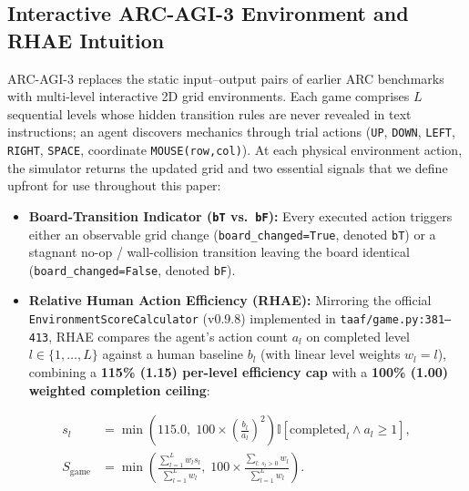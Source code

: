 \documentclass[10pt]{article}
\newcommand{\code}[1]{\texttt{#1}}
\begin{document}
\subsection{Interactive ARC-AGI-3 Environment and RHAE Intuition}
ARC-AGI-3 \citep{chollet2026arc3} replaces the static input--output pairs of earlier ARC benchmarks with multi-level interactive 2D grid environments. Each game comprises $L$ sequential levels whose hidden transition rules are never revealed in text instructions; an agent discovers mechanics through trial actions (\code{UP}, \code{DOWN}, \code{LEFT}, \code{RIGHT}, \code{SPACE}, coordinate \code{MOUSE(row,col)}). At each physical environment action, the simulator returns the updated grid and two essential signals that we define upfront for use throughout this paper:
\begin{itemize}[leftmargin=1.4em,itemsep=2pt]
\item \textbf{Board-Transition Indicator (\code{bT} vs.\ \code{bF}):} Every executed action triggers either an observable grid change (\code{board\_changed=True}, denoted \code{bT}) or a stagnant no-op / wall-collision transition leaving the board identical (\code{board\_changed=False}, denoted \code{bF}).
\item \textbf{Relative Human Action Efficiency (RHAE):} Mirroring the official \code{EnvironmentScoreCalculator} (v0.9.8) implemented in \code{taaf/game.py:381--413}, RHAE compares the agent's action count $a_l$ on completed level $l \in \{1,\dots,L\}$ against a human baseline $b_l$ (with linear level weights $w_l = l$), combining a \textbf{115\% (1.15) per-level efficiency cap} with a \textbf{100\% (1.00) weighted completion ceiling}:
\end{itemize}
\begin{equation}
\begin{aligned}
s_l &= \min\!\left(115.0,\; 100 \times \left(\frac{b_l}{a_l}\right)^{\!2}\right)\mathbb{I}[\text{completed}_l \land a_l \ge 1], \\
S_{\text{game}} &= \min\!\left(\frac{\sum_{l=1}^L w_l s_l}{\sum_{l=1}^L w_l},\; 100 \times \frac{\sum_{l:\,s_l > 0} w_l}{\sum_{l=1}^L w_l}\right).
\end{aligned}
\label{eq:rhae}
\end{equation}
\end{document}
